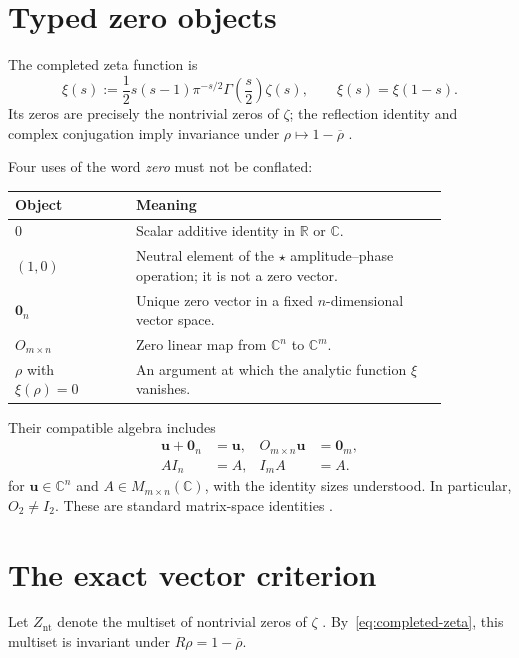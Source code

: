 \documentclass[11pt]{article}
\newcommand{\Znt}{Z_{\mathrm{nt}}}
\newcommand{\vzero}{\mathbf 0}
\begin{document}
\section{Typed zero objects}
The completed zeta function is
\begin{equation}\label{eq:completed-zeta}
 \xi(s):=\frac12s(s-1)\pi^{-s/2}\Gamma\!\left(\frac{s}{2}\right)\zeta(s),
 \qquad \xi(s)=\xi(1-s).
\end{equation}
Its zeros are precisely the nontrivial zeros of $\zeta$; the reflection identity and complex
conjugation imply invariance under $\rho\mapsto1-\overline\rho$
\cite{Titchmarsh,DLMFreflection,DLMFzeros}.

Four uses of the word \emph{zero} must not be conflated:
\begin{center}
\begin{tabular}{p{0.24\linewidth}p{0.62\linewidth}}
\toprule
Object & Meaning\\
\midrule
$0$ & Scalar additive identity in $\mathbb R$ or $\mathbb C$.\\
$(1,0)$ & Neutral element of the $\star$ amplitude--phase operation; it is not a zero vector.\\
$\vzero_n$ & Unique zero vector in a fixed $n$-dimensional vector space.\\
$O_{m\times n}$ & Zero linear map from $\mathbb C^n$ to $\mathbb C^m$.\\
$\rho$ with $\xi(\rho)=0$ & An argument at which the analytic function $\xi$ vanishes.\\
\bottomrule
\end{tabular}
\end{center}
Their compatible algebra includes
\begin{align}\label{eq:zero-identities}
 \mathbf u+\vzero_n&=\mathbf u,&
 O_{m\times n}\mathbf u&=\vzero_m,\\
 AI_n&=A,& I_mA&=A.
\end{align}
for $\mathbf u\in\mathbb C^n$ and $A\in M_{m\times n}(\mathbb C)$, with the identity sizes
understood.  In particular, $O_2\ne I_2$.  These are standard matrix-space identities
\cite{HornJohnson}.

\section{The exact vector criterion}
Let $\Znt$ denote the multiset of nontrivial zeros of $\zeta$
\cite{Titchmarsh,DLMFzeros}.  By~\eqref{eq:completed-zeta}, this multiset is invariant under
$R\rho=1-\overline\rho$.
\end{document}
